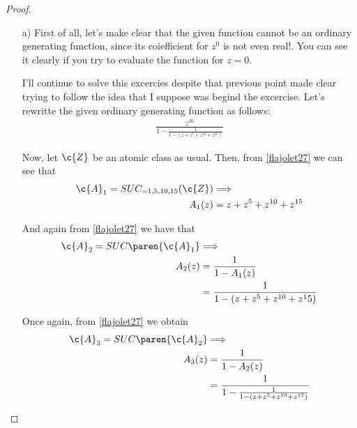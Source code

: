 \begin{proof}
    \begin{itemize}
        \item[a)]
            First of all, let's make clear that the given function cannot be an ordinary generating function, since its coiefficient for $z^0$ is not even
            real!. You can see it clearly if you try to evaluate the function for $z=0$.\pn
            
            I'll continue to solve this excercies despite that previous point made clear trying to follow the idea that I suppose was begind the
            excercise. Let's rewritte the given ordinary generating function as follows:
            \begin{align}
                \frac{z^{20}}{1 - \frac{1}{1 - (z + z^5 + z^{10} + z^{15})}}
            \end{align}\pn
            
            Now, let $\c{Z}$ be an atomic class as usual. Then, from \eqref{flajolet27} we can see that
            \begin{align}
                    \c{A}_1 = SUC_{=1,5,10,15}(\c{Z})   &\Longrightarrow                \\
                    A_1(z)                              &= z + z^5 + z^{10} + z^{15}
            \end{align}\pn
            
            And again from \eqref{flajolet27} we have that
            \begin{align}
                    \c{A}_2 = SUC\paren{\c{A}_1}    &\Longrightarrow                            \\
                    A_2(z)                          &= \frac{1}{1 - A_1(z)}                     \\
                                                    &= \frac{1}{1 - (z + z^5 + z^{10} + z^15)}
            \end{align}\pn
            
            Once again, from \eqref{flajolet27} we obtain
            \begin{align}
                    \c{A}_3 = SUC\paren{\c{A}_2}    &\Longrightarrow                                            \\
                    A_3(z)                          &= \frac{1}{1 - A_2(z)}                                     \\
                                                    &= \frac{1}{1 - \frac{1}{1 - (z + z^5 + z^{10} + z^{15})}}
            \end{align}
            

\end{itemize}
\end{proof}
